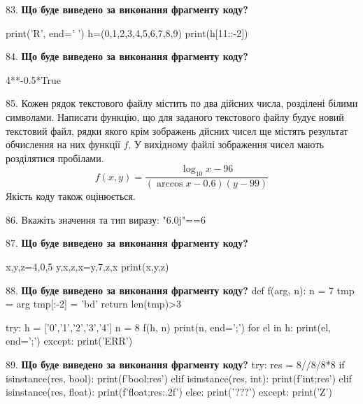\documentclass[11pt]{article}
\begin{document}
83. \textbf{Що буде виведено за виконання фрагменту коду?}

print('R', end=' ')
h=(0,1,2,3,4,5,6,7,8,9)
print(h[11::-2])

\par\vspace{5mm}

84. \textbf{Що буде виведено за виконання фрагменту коду?}

4**-0.5*True
\par\vspace{5mm}

85. 
Кожен рядок текстового файлу містить по два дійсних числа, розділені білими символами.
Написати функцію, що для заданого текстового файлу будує новий текстовий файл, рядки якого крім зображень дйсних чисел ще містять результат обчислення на них функції $f$. У вихідному файлі зображення чисел мають розділятися пробілами. 
$$f(x, y) =\frac{\log_{10} x - 96}{(\arccos x - 0.6) (y - 99)}$$ 
Якість коду також оцінюється.

\par\vspace{5mm}

86. 
Вкажіть значення та тип виразу:
"6.0j"==6
\par\vspace{5mm}

87. \textbf{Що буде виведено за виконання фрагменту коду?}

x,y,z=4,0,5
y,x,z,x=y,7,z,x
print(x,y,z)
\par\vspace{5mm}

88. \textbf{Що буде виведено за виконання фрагменту коду?}
def f(arg, n):
    n = 7
    tmp = arg
    tmp[:-2] = 'bd'
    return len(tmp)>3

try:
    h = ['0','1','2','3','4']
    n = 8
    f(h, n)
    print(n, end=';')
    for el in h:
        print(el, end=';')
except:
    print('ERR')
\par\vspace{5mm}

89. \textbf{Що буде виведено за виконання фрагменту коду?}
try:
    res = 8//8/8*8
    if isinstance(res, bool):
        print(f'bool;{res}')
    elif isinstance(res, int):
        print(f'int;{res}')
    elif isinstance(res, float):
        print(f'float;{res:.2f}')
    else:
        print('???')
except:
    print('Z')
\par\vspace{5mm}
\end{document}

